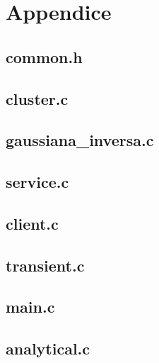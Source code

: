 \chapter{Appendice}\label{appendice}
\lstset{frame=}
\section{common.h}

\pagebreak
\section{cluster.c}

\pagebreak
\section{gaussiana\_inversa.c}

\pagebreak
\section{service.c}

\pagebreak
\section{client.c}

\pagebreak
\section{transient.c}

\pagebreak
\section{main.c}

\pagebreak
\section{analytical.c}

